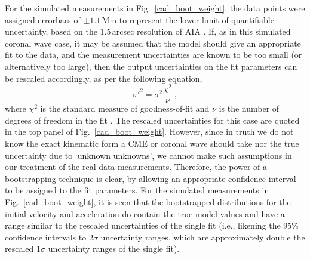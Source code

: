 \documentclass[structabstract]{aa}
\begin{document}
For the simulated measurements in Fig.~\ref{cad_boot_weight}, the data points were assigned errorbars of $\pm1.1$\,Mm to represent the lower limit of quantifiable uncertainty, based on the 1.5\,arcsec resolution of AIA \citep{2012SoPh..275...17L}. If, as in this simulated coronal wave case, it may be assumed that the model should give an appropriate fit to the data, and the measurement uncertainties are known to be too small (or alternatively too large), then the output uncertainties on the fit parameters can be rescaled accordingly, as per the following equation,
\begin{equation}
\sigma'^2 = \sigma^2 \frac{\chi^2}{\nu} \ ,
\end{equation}
where $\chi^2$ is the standard measure of goodness-of-fit and $\nu$ is the number of degrees of freedom in the fit \citep[see, for example,][]{2003drea.book.....B}. The rescaled uncertainties for this case are quoted in the top panel of Fig.~\ref{cad_boot_weight}. However, since in truth we do not know the exact kinematic form a CME or coronal wave should take nor the true uncertainty due to `unknown unknowns', we cannot make such assumptions in our treatment of the real-data measurements. Therefore, the power of a bootstrapping technique is clear, by allowing an appropriate confidence interval to be assigned to the fit parameters. For the simulated measurements in Fig.~\ref{cad_boot_weight}, it is seen that the bootstrapped distributions for the initial velocity and acceleration do contain the true model values and have a range similar to the rescaled uncertainties of the single fit (i.e., likening the 95\% confidence intervals to $2\sigma$ uncertainty ranges, which are approximately double the rescaled $1\sigma$ uncertainty ranges of the single fit).
\end{document}
